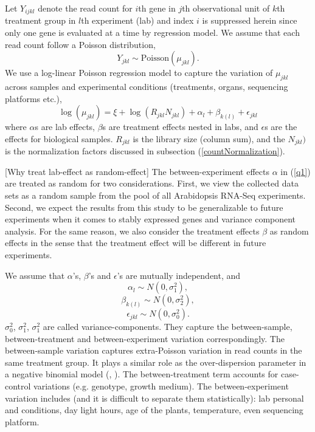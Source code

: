\documentclass[11pt, a4paper]{article}
\begin{document}
Let $Y_{ijkl}$ denote the read count for $i$th gene
in $j$th observational unit of $k$th treatment group in $l$th experiment (lab)
and index $i$ is suppressed herein since only one gene is evaluated at a time
by regression model. We assume that each read count follow a Poisson
distribution,  
\[Y_{jkl}\sim \text{Poisson}(\mu_{jkl}).\] 
We use a log-linear Poisson regression model to capture 
the variation of $\mu_{jkl}$ across samples and experimental conditions (treatments,
organs, sequencing platforms etc.),
\begin{equation}\label{q1}
    \log( \mu_{jkl}) = \xi + \log(R_{jkl}N_{jkl})+ \alpha_l + \beta_{k(l)} + \epsilon_{jkl} 
\end{equation}
where $\alpha$s are lab effects,  $\beta$s are treatment effects
nested in labs, and $\epsilon$s are the effects for biological samples. 
$R_{jkl}$ is the library size (column sum), and the $N_{jkl})$ is the normalization factors discussed in
subsection (\ref{countNormalization}).

[Why treat lab-effect as random-effect] The between-experiment effects $\alpha$ in (\ref{q1}) are treated as random for two considerations. First, we view the collected data sets as a random sample from the pool of all Arabidopsis RNA-Seq experiments. Second, we expect the results from this study to be generalizable to future experiments when it comes to stably expressed genes and variance component analysis.
For the same reason, we also consider the treatment effects $\beta$ as random effects
in the sense that the treatment effect will be different in future experiments.

We assume that $\alpha$'s, $\beta$'s and $\epsilon$'s are mutually independent, and  
  \[\alpha_l\sim N(0, \sigma^2_1),\] 
  \[\beta_{k(l)}\sim N(0, \sigma^2_2),\]
   \[\epsilon_{jkl}\sim N(0, \sigma_0^2).\]
$\sigma_0^2$, $\sigma_1^2$, $\sigma_1^2$ are called variance-components. They capture the
between-sample, between-treatment and between-experiment variation
correspondingly. The between-sample variation captures extra-Poisson variation in read counts
in the same treatment group. It plays a similar role as the over-dispersion parameter
in a negative binomial model (\cite{anders2010differential}, \cite{di2011nbp}).
The between-treatment term accounts for case-control variations (e.g. genotype, growth medium). 
The between-experiment variation includes (and it is difficult to separate them statistically): lab personal and conditions, day light hours, age of the plants, temperature, even sequencing platform.
\end{document}
